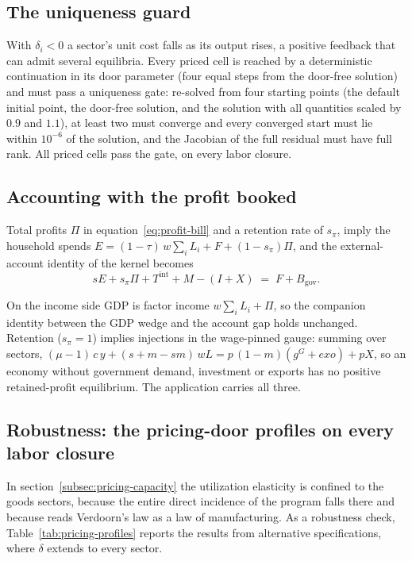 \subsection{The uniqueness guard}\label{app:pricing-guard}
With $\delta_i < 0$ a sector's unit cost falls as its output rises, a positive
feedback that can admit several equilibria. Every priced cell is reached by a
deterministic continuation in its door parameter (four equal steps from the
door-free solution) and must pass a uniqueness gate: re-solved from four
starting points (the default initial point, the door-free solution, and the
solution with all quantities scaled by $0.9$ and $1.1$), at least two must
converge and every converged start must lie within $10^{-6}$ of the solution,
and the Jacobian of the full residual must have full rank. All priced cells pass the gate, on every labor closure.

\subsection{Accounting with the profit booked}\label{app:pricing-accounting}
Total profits $\Pi$ in equation~\eqref{eq:profit-bill} and a retention
rate of $s_\pi$, imply the household spends $E = (1-\tau)\,w\textstyle\sum_i L_i + F + (1-s_\pi)\Pi$, and the external-account identity of the kernel becomes
\begin{equation}\label{eq:app-account}
  sE + s_\pi \Pi + T^{\mathrm{int}} + M - (I + X) \;=\; F + B_{\mathrm{gov}}.
\end{equation}

On the income side GDP is factor income $w\sum_i L_i + \Pi$, so the companion identity between the GDP wedge and the account gap holds unchanged. Retention ($s_\pi = 1$) implies injections in the wage-pinned gauge: summing over sectors,
$(\mu - 1)\,c\,y + (s + m - s m)\,w L = p\,(1-m)(g^G + \mathit{exo}) + pX$, so an
economy without government demand, investment or exports has no positive
retained-profit equilibrium. The application carries all three.

\subsection{Robustness: the pricing-door profiles on every labor closure}\label{app:profiles}

In section~\ref{subsec:pricing-capacity} the utilization elasticity is confined to
the goods sectors, because the entire direct incidence of the program falls
there and because \textcite{Kaldor1966} reads Verdoorn's law as a law of
manufacturing. As a robustness check, Table~\ref{tab:pricing-profiles} reports the results from alternative specifications, where $\delta$ extends to every sector.


